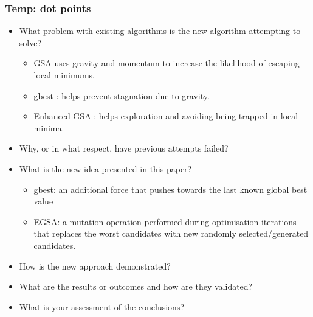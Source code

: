 \subsubsection{Temp: dot points}
\begin{itemize}
    \item What problem with existing algorithms is the new algorithm attempting to solve?
    \begin{itemize}
        \item GSA uses gravity and momentum to increase the likelihood of escaping local minimums.
        \item gbest \cite{gbestGSA}: helps prevent stagnation due to gravity.
        \item Enhanced GSA \cite{EGSA}: helps exploration and avoiding being trapped in local minima.
    \end{itemize}

    \item Why, or in what respect, have previous attempts failed?
    
    \item What is the new idea presented in this paper?
    \begin{itemize}
        \item gbest: an additional force that pushes towards the last known global best value
        \item EGSA: a mutation operation performed during optimisation iterations that replaces the worst candidates with new randomly selected/generated candidates.
    \end{itemize}

    \item How is the new approach demonstrated?
    
    \item What are the results or outcomes and how are they validated?
    
    \item What is your assessment of the conclusions?
\end{itemize}
